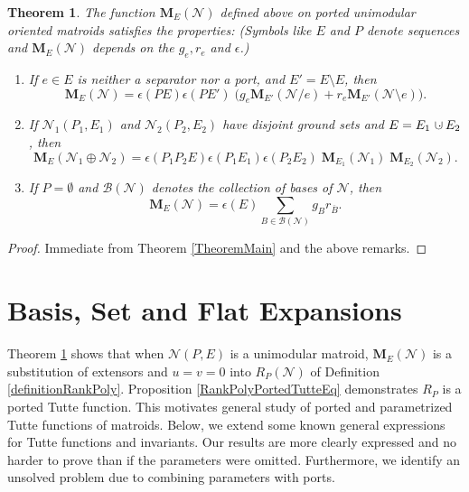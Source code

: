 \documentclass[12pt]{article}
\newtheorem{theorem}{Theorem}[section]
\theoremstyle{definition}
\newcommand{\dunion}
{\mbox{\hbox{\hskip6pt$\cdot$\hskip-5.50pt$\cup$\hskip2pt}}}
\newcommand{\scomp}[1]{\ensuremath{\overline{#1}}}
\newcommand{\ext}[1]{\ensuremath{\mathbf{#1}}}
\begin{document}
\begin{theorem}
\label{EquationsExtFunMatroids}
The function $\ext{M}_E(\mathcal{N})$ defined above 
on ported unimodular oriented matroids satisfies the 
properties:  (Symbols like $E$ and $P$ 
denote sequences and $\ext{M}_E(\mathcal{N})$ 
depends on the $g_e, r_e$ and $\epsilon$.)
\begin{enumerate}
\item If $e\in E$ is neither a separator nor a port, and $E'=E\setminus E$,  
then
\[
\ext{M}_E(\mathcal{N})=\epsilon(PE)\epsilon(PE')\;
\big(g_e\ext{M}_{E'}(\mathcal{N}/e) + r_e \ext{M}_{E'}(\mathcal{N}\setminus e)\big).
\]
\item If 
$\mathcal{N}_1(P_1,E_1)$ and $\mathcal{N}_2(P_2,E_2)$ have 
disjoint ground sets and $E=E_1\dunion E_2$, then
\[
\ext{M}_E(\mathcal{N}_1\oplus\mathcal{N}_2)=
\epsilon(P_1P_2E)\epsilon(P_1E_1)\epsilon(P_2E_2)\;
\ext{M}_{E_1}(\mathcal{N}_1)\;\ext{M}_{E_2}(\mathcal{N}_2).
\]
\item If $P=\emptyset$ and  
$\mathcal{B}(\mathcal{N})$ denotes the collection of bases of 
$\mathcal{N}$, then
\[
\ext{M}_E(\mathcal{N})=\epsilon(E)\sum_{B\in\mathcal{B}(\mathcal{N})}g_Br_{\scomp{B}}.
\]

\end{enumerate}
\end{theorem}
\begin{proof}
Immediate from Theorem \ref{TheoremMain} and the above
remarks.
\end{proof}

\section{Basis, Set and Flat Expansions}
\label{Activity}

Theorem \ref{EquationsExtFunMatroids} shows 
that when $\mathcal{N}(P,E)$ is a unimodular matroid,
$\ext{M}_E(\mathcal{N})$ 
is a substitution of extensors
and $u=v=0$ into
$R_P(\mathcal{N})$ of Definition \ref{definitionRankPoly}.
Proposition \ref{RankPolyPortedTutteEq} demonstrates $R_P$
is a ported Tutte function.
This motivates general study of ported and parametrized 
Tutte functions of matroids.  Below, we extend some
known general expressions for Tutte functions and invariants.
Our results are
more clearly expressed and no harder to prove than if 
the parameters were omitted.  Furthermore,
we identify an unsolved problem due to 
combining parameters with ports.
\end{document}
